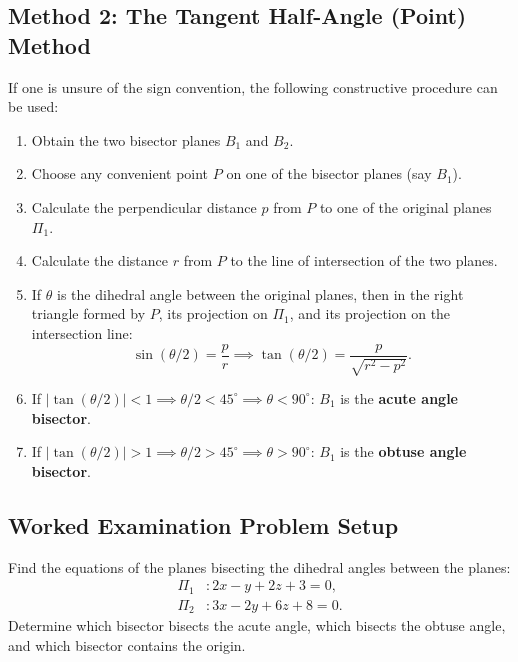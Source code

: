 \subsection{Method 2: The Tangent Half-Angle (Point) Method}
If one is unsure of the sign convention, the following constructive procedure can be used:
\begin{enumerate}
    \item Obtain the two bisector planes $B_1$ and $B_2$.
    \item Choose any convenient point $P$ on one of the bisector planes (say $B_1$).
    \item Calculate the perpendicular distance $p$ from $P$ to one of the original planes $\Pi_1$.
    \item Calculate the distance $r$ from $P$ to the line of intersection of the two planes.
    \item If $\theta$ is the dihedral angle between the original planes, then in the right triangle formed by $P$, its projection on $\Pi_1$, and its projection on the intersection line:
    \begin{equation}
        \sin(\theta/2) = \frac{p}{r} \implies \tan(\theta/2) = \frac{p}{\sqrt{r^2 - p^2}}.
    \end{equation}
    \item If $|\tan(\theta/2)| < 1 \implies \theta/2 < 45^\circ \implies \theta < 90^\circ$: $B_1$ is the \textbf{acute angle bisector}.
    \item If $|\tan(\theta/2)| > 1 \implies \theta/2 > 45^\circ \implies \theta > 90^\circ$: $B_1$ is the \textbf{obtuse angle bisector}.
\end{enumerate}

\subsection{Worked Examination Problem Setup}
\begin{examplebox}
Find the equations of the planes bisecting the dihedral angles between the planes:
\begin{align}
    \Pi_1 &: 2x - y + 2z + 3 = 0, \label{eq:ex_p1} \\
    \Pi_2 &: 3x - 2y + 6z + 8 = 0. \label{eq:ex_p2}
\end{align}
Determine which bisector bisects the acute angle, which bisects the obtuse angle, and which bisector contains the origin.
\end{examplebox}

